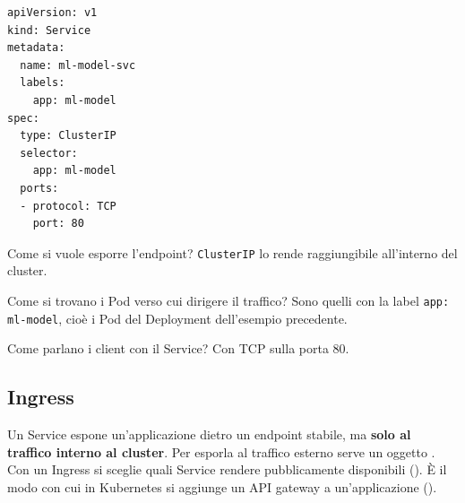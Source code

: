 \begin{esempio}
\begin{verbatim}
apiVersion: v1
kind: Service
metadata:
  name: ml-model-svc
  labels:
    app: ml-model
spec:
  type: ClusterIP
  selector:
    app: ml-model
  ports:
  - protocol: TCP
    port: 80
\end{verbatim}
\begin{description}[leftmargin=0pt, style=unboxed]
  \item[\texttt{type}.] Come si vuole esporre l'endpoint? \texttt{ClusterIP} lo rende raggiungibile all'interno del
    cluster.
  \item[\texttt{selector}.] Come si trovano i Pod verso cui dirigere il traffico? Sono quelli con la label
    \texttt{app: ml-model}, cioè i Pod del Deployment dell'esempio precedente.
  \item[\texttt{ports}.] Come parlano i client con il Service? Con TCP sulla porta 80.
\end{description}
\end{esempio}

\subsection{Ingress}
\label{sec:k8s-ingress}

Un Service espone un'applicazione dietro un endpoint stabile, ma \textbf{solo al traffico interno al cluster}. Per
esporla al traffico esterno serve un oggetto . Con un Ingress si sceglie quali Service rendere
pubblicamente disponibili (). È il modo con cui in Kubernetes si aggiunge un API gateway a
un'applicazione ().

